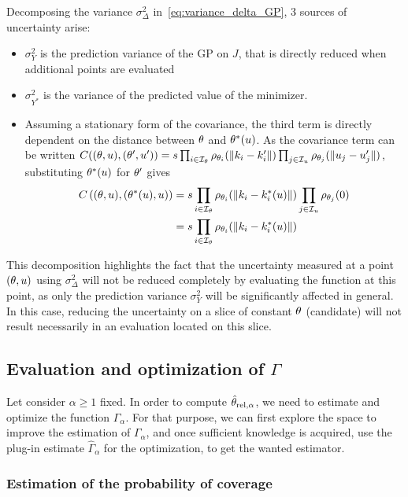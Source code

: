 \documentclass[../../Main_ManuscritThese.tex]{subfiles}
\begin{document}
Decomposing the variance $\sigma^2_{\Delta}$ in~\cref{eq:variance_delta_GP}, 3 sources of uncertainty arise:
\begin{itemize}
\item $\sigma^2_{Y}$ is the prediction variance of the GP on $J$, that is directly reduced when additional points are evaluated
\item $\sigma^2_{Y^*}$ is the variance of the predicted value of the minimizer.
\item Assuming a stationary form of the covariance, the third term is directly dependent on the distance between $\theta$ and $\theta^*(u)$. As the covariance term can be written $C((\theta,u), (\theta',u')) = s \prod_{i\in\mathcal{I}_{\theta}}\rho_{\theta_i}(\|k_i - k'_i\|) \prod_{j\in\mathcal{I}_{u}} \rho_{\theta_j}(\|u_j - u'_j\|)$, substituting $\theta^*(u)$ for $\theta^\prime$ gives
\begin{align}
  C\left((\theta,u),(\theta^*(u),u)\right) &= s \prod_{i\in\mathcal{I}_{\theta}}\rho_{\theta_i}(\|k_i - k^*_i(u)\|)\prod_{j\in\mathcal{I}_{u}} \rho_{\theta_j}(0) \\
  &=s \prod_{i\in\mathcal{I}_{\theta}}\rho_{\theta_i}(\|k_i - k^*_i(u)\|)
\end{align}
\end{itemize}
This decomposition highlights the fact that the uncertainty measured at a point $(\theta, u)$ using $\sigma_{\Delta}^2$ will not be reduced completely by evaluating the function at this point, as only the prediction variance $\sigma_Y^2$ will be significantly affected in general. In this case, reducing the uncertainty on a slice of constant $\theta$ (candidate) will not result necessarily in an evaluation located on this slice.


\subsection{Evaluation and optimization of $\Gamma$}
Let consider $\alpha\geq 1$ fixed. In order to compute $\hat{\theta}_{\mathrm{rel, \alpha}}$, we need to estimate and optimize the function $\Gamma_{\alpha}$. For that purpose, we can first explore the space to improve the estimation of $\Gamma_{\alpha}$, and once sufficient knowledge is acquired, use the plug-in estimate $\hat{\Gamma}_{\alpha}$ for the optimization, to get the wanted estimator.
\subsubsection{Estimation of the probability of coverage}
\end{document}
